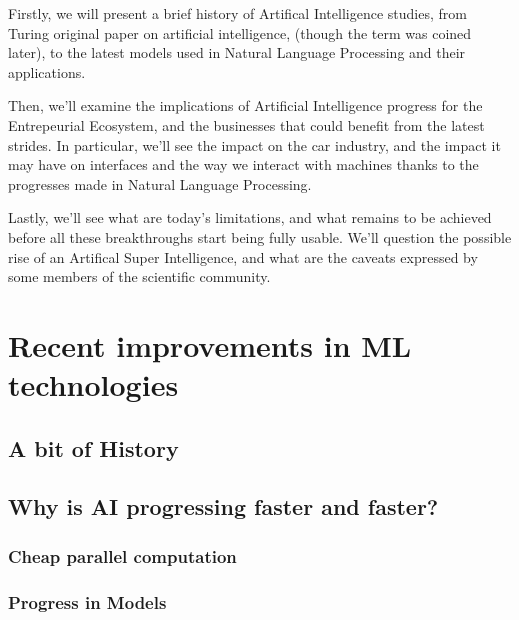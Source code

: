 \documentclass[12pt]{article}
\begin{document}
Firstly, we will present a brief history of Artifical
Intelligence studies, from Turing original paper on artificial intelligence,
(though the term was coined later), to the latest models used in Natural
Language Processing and their applications.

\noindent Then, we'll examine the implications of Artificial Intelligence
progress for the Entrepeurial Ecosystem, and the businesses that could benefit
from the latest strides. In particular, we'll see the impact on the car
industry, and the impact it may have on interfaces and the way we interact with
machines thanks to the progresses made in Natural Language Processing.

\noindent Lastly, we'll see what are today's limitations, and what remains to be
achieved before all these breakthroughs start being fully usable. We'll question
the possible rise of an Artifical Super Intelligence, and what are the caveats
expressed by some members of the scientific community.

\pagebreak


\section{Recent improvements in ML technologies}

\subsection{A bit of History}


\subsection{Why is AI progressing faster and faster?}



\subsubsection{Cheap parallel computation}

\subsubsection{Progress in Models}
\end{document}
